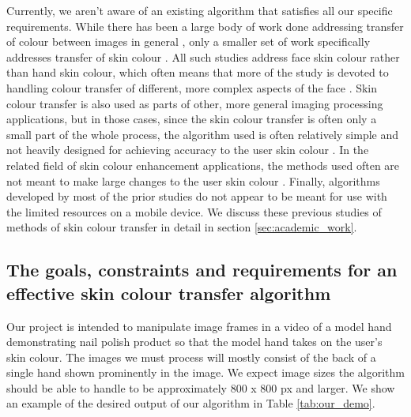 Currently, we aren't aware of an existing algorithm that satisfies all our specific requirements. While there has been a large body of work done addressing transfer of colour between images in general \cite{reinhard_2001_transfer, pitie_2005_pdf, chen_2014_propagation, chang_2015_palette, zhang_2017_decomposition}, only a smaller set of work specifically addresses transfer of skin colour \cite{yin_2004_transfer, seo_2005_transfer, yang_2017_semantic}. All such studies address face skin colour rather than hand skin colour, which often means that more of the study is devoted to handling colour transfer of different, more complex aspects of the face \cite{yang_2017_semantic}. Skin colour transfer is also used as parts of other, more general imaging processing applications, but in those cases, since the skin colour transfer is often only a small part of the whole process, the algorithm used is often relatively simple and not heavily designed for achieving accuracy to the user skin colour \cite{shilkrot_2013_garment, li_2015_replace}. In the related field of skin colour enhancement applications, the methods used often are not meant to make large changes to the user skin colour \cite{aradhye_2009_enhancement, lee_2010_mobile}. Finally, algorithms developed by most of the prior studies do not appear to be meant for use with the limited resources on a mobile device. We discuss these previous studies of methods of skin colour transfer in detail in section \ref{sec:academic_work}.



\subsection{The goals, constraints and requirements for an effective skin colour transfer algorithm}
Our project is intended to manipulate image frames in a video of a model hand demonstrating nail polish product so that the model hand takes on the user's skin colour. The images we must process will mostly consist of the back of a single hand shown prominently in the image. We expect image sizes the algorithm should be able to handle to be approximately 800 x 800 px and larger. We show an example of the desired output of our algorithm in Table \ref{tab:our_demo}.

